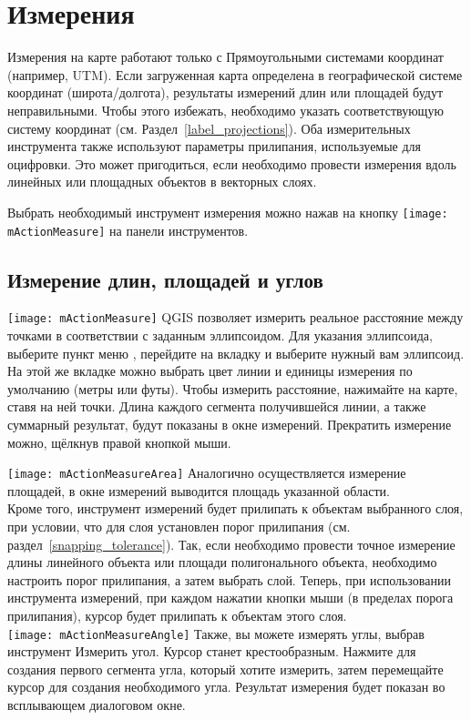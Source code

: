 \section{Измерения}\label{sec:measure}

Измерения на карте работают только с Прямоугольными системами координат
(например, UTM). Если загруженная карта определена в географической
системе координат (широта/долгота), результаты измерений длин или площадей
будут неправильными. Чтобы этого избежать, необходимо указать
соответствующую систему координат (см. Раздел~\ref{label_projections}).
Оба измерительных инструмента также используют параметры прилипания, используемые
для оцифровки. Это может пригодиться, если необходимо провести измерения вдоль
линейных или площадных объектов в векторных слоях.

Выбрать необходимый инструмент измерения можно нажав на кнопку
\texttt{[image: mActionMeasure]} на панели инструментов.

\subsection{Измерение длин, площадей и углов}

\texttt{[image: mActionMeasure]}
QGIS позволяет измерить реальное расстояние между точками в
соответствии с заданным эллипсоидом. Для указания эллипсоида, выберите пункт
меню  \arrow {}, перейдите на вкладку
 и выберите нужный вам эллипсоид. На этой же вкладке
можно выбрать цвет линии и единицы измерения по умолчанию (метры или футы).
Чтобы измерить расстояние, нажимайте на карте, ставя на ней точки. Длина
каждого сегмента получившейся линии, а также суммарный результат, будут
показаны в окне измерений. Прекратить измерение можно, щёлкнув правой кнопкой мыши.

\texttt{[image: mActionMeasureArea]} Аналогично осуществляется измерение
площадей, в окне измерений выводится площадь указанной области.\\
Кроме того, инструмент измерений будет прилипать к объектам выбранного слоя,
при условии, что для слоя установлен порог прилипания
(см. раздел~\ref{snapping_tolerance}). Так, если необходимо провести точное
измерение длины линейного объекта или площади полигонального объекта, необходимо
настроить порог прилипания, а затем выбрать слой. Теперь, при использовании
инструмента измерений, при каждом нажатии кнопки мыши (в пределах порога
прилипания), курсор будет прилипать к объектам этого слоя. \\
\texttt{[image: mActionMeasureAngle]}
Также, вы можете измерять углы, выбрав инструмент Измерить угол. Курсор
станет крестообразным. Нажмите для создания первого сегмента угла, который
хотите измерить, затем перемещайте курсор для создания необходимого угла.
Результат измерения будет показан во всплывающем диалоговом окне.

